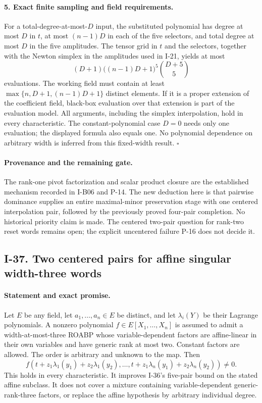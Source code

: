 \paragraph{5. Exact finite sampling and field requirements.}
For a total-degree-at-most-$D$ input, the substituted polynomial
has degree at most $D$ in $t$, at most $(n-1)D$ in each of the
five selectors, and total degree at most $D$ in the five
amplitudes. The tensor grid in $t$ and the selectors, together
with the Newton simplex in the amplitudes used in I-21, yields
at most
\[
 (D+1)\bigl((n-1)D+1\bigr)^5\binom{D+5}{5}
 \tag{I.89}
\]
evaluations. The working field must contain at least
$\max\{n,D+1,(n-1)D+1\}$ distinct elements. If it is a proper
extension of the coefficient field, black-box evaluation over
that extension is part of the evaluation model. All arguments,
including the simplex interpolation, hold in every characteristic.
The constant-polynomial case $D=0$ needs only one evaluation;
the displayed formula also equals one. No polynomial dependence
on arbitrary width is inferred from this fixed-width result.
\hfill$\square$

\paragraph{Provenance and the remaining gate.}
The rank-one pivot factorization and scalar product closure are
the established mechanism recorded in I-B06 and P-14. The new
deduction here is that pairwise dominance supplies an entire
maximal-minor preservation stage with one centered interpolation
pair, followed by the previously proved four-pair completion.
No historical priority claim is made. The centered two-pair
question for rank-two reset words remains open; the explicit
uncentered failure P-16 does not decide it.

\subsection{I-37. Two centered pairs for affine singular width-three words}
\label{I-37}

\paragraph{Statement and exact promise.}
Let $E$ be any field, let $a_1,\ldots,a_n\in E$ be distinct, and let
$\lambda_i(Y)$ be their Lagrange polynomials. A nonzero polynomial
$f\in E[X_1,\ldots,X_n]$ is assumed to admit a width-at-most-three
ROABP whose variable-dependent factors are affine-linear in their
own variables and have generic rank at most two. Constant factors
are allowed. The order is arbitrary and unknown to the map. Then
\[
 f\left(t+z_1\lambda_1(y_1)+z_2\lambda_1(y_2),\ldots,
        t+z_1\lambda_n(y_1)+z_2\lambda_n(y_2)\right)\ne0.
 \tag{I.90}
\]
This holds in every characteristic. It improves I-36's five-pair
bound on the stated affine subclass. It does not cover a mixture
containing variable-dependent generic-rank-three factors, or
replace the affine hypothesis by arbitrary individual degree.

